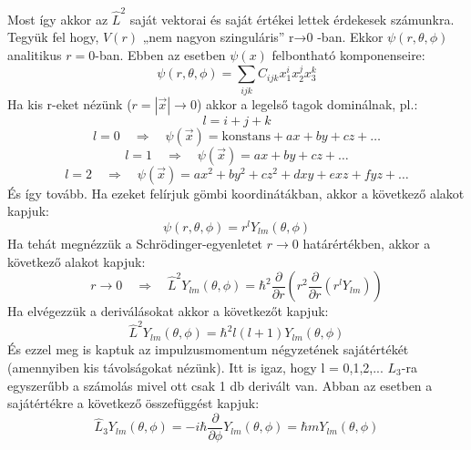 \documentclass[a4paper,12pt]{article}
\begin{document}
Most így akkor az $\hat{L}^2$ saját vektorai és saját értékei lettek érdekesek számunkra. Tegyük fel hogy, $V(r)$ „nem nagyon szinguláris” r→0 -ban.
Ekkor $\psi(r, \theta, \phi)$ analitikus $r = 0$-ban. Ebben az esetben $\psi(x)$ felbontható komponenseire:
\begin{equation}
    \psi(r, \theta, \phi) = \sum_{ijk} C_{ijk} x_1^i x_2^j x_3^k
\end{equation}
Ha kis r-eket nézünk ($r = |\vec{x}| \to 0$) akkor a legelső tagok dominálnak, pl.:
\begin{equation}
    l = i + j + k
\end{equation}
\begin{equation}
    l = 0 \quad \Rightarrow \quad \psi(\vec{x}) = \text{konstans} + ax + by + cz + \ldots
\end{equation}
\begin{equation}
    l = 1 \quad \Rightarrow \quad \psi(\vec{x}) = a x + b y + c z + \ldots
\end{equation}
\begin{equation}
    l = 2 \quad \Rightarrow \quad \psi(\vec{x}) = a x^2 + b y^2 + c z^2 + d xy + e xz + f yz + \ldots
\end{equation}
És így tovább. Ha ezeket felírjuk gömbi koordinátákban, akkor a következő alakot kapjuk:
\begin{equation}
    \psi(r, \theta, \phi) = r^l Y_{lm}(\theta, \phi)
\end{equation}
Ha tehát megnézzük a Schrödinger-egyenletet $r \to 0$ határértékben, akkor a következő alakot kapjuk:
\begin{equation}
    r \to 0 \quad \Rightarrow \quad \hat{L}^2 Y_{lm}(\theta, \phi) = \hbar^2 \frac{\partial}{\partial r}(r^2 \frac{\partial}{\partial r} (r^l Y_{lm}))
\end{equation}
Ha elvégezzük a deriválásokat akkor a következőt kapjuk:
\begin{equation}
    \hat{L}^2 Y_{lm}(\theta, \phi) = \hbar^2 l (l + 1) Y_{lm}(\theta, \phi)
\end{equation}
És ezzel meg is kaptuk az impulzusmomentum négyzetének sajátértékét (amennyiben kis távolságokat nézünk). Itt is igaz, hogy l = 0,1,2,...
$L_3$-ra egyszerűbb a számolás mivel ott csak 1 db derivált van. Abban az esetben a sajátértékre a következő összefüggést kapjuk:
\begin{equation}
    \hat{L}_3 Y_{lm}(\theta, \phi) = - i \hbar \frac{\partial}{\partial \phi} Y_{lm}(\theta, \phi) = \hbar m Y_{lm}(\theta, \phi)
\end{equation}
\end{document}
